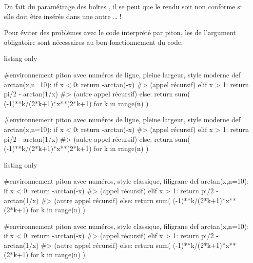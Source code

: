 \documentclass[a4paper,french,11pt]{article}
\newcommand\ctex[1]{\tcbox[vignettelatex]{#1}}
\begin{document}
\begin{noteblock}
Du fait du paramétrage des boîtes \ctex{tcolorbox}, il se peut que le rendu soit non conforme si elle doit être insérée dans une autre \ctex{tcolorbox}\ldots{} !
\end{noteblock}

\begin{noteblock}
Pour éviter des problèmes avec le code interprété par \textsf{piton}, les \ctex{\{\}} de l'argument obligatoire sont nécessaires au bon fonctionnement du code.
\end{noteblock}

\begin{PresCodeTexPL}{listing only}
\begin{CodePiton}{}
#environnement piton avec numéros de ligne, pleine largeur, style moderne
def arctan(x,n=10):
	if x < 0:
		return -arctan(-x) #> (appel récursif)
	elif x > 1:
		return pi/2 - arctan(1/x) #> (autre appel récursif)
	else:
		return sum( (-1)**k/(2*k+1)*x**(2*k+1) for k in range(n) )
\end{CodePiton}
\end{PresCodeTexPL}

\begin{CodePiton}{}
#environnement piton avec numéros de ligne, pleine largeur, style moderne
def arctan(x,n=10):
	if x < 0:
		return -arctan(-x) #> (appel récursif)
	elif x > 1:
		return pi/2 - arctan(1/x) #> (autre appel récursif)
	else:
		return sum( (-1)**k/(2*k+1)*x**(2*k+1) for k in range(n) )
\end{CodePiton}

\begin{PresCodeTexPL}{listing only}
\begin{CodePiton}[Style=Classique,Filigrane]{}
#environnement piton avec numéros, style classique, filigrane
def arctan(x,n=10):
	if x < 0:
		return -arctan(-x) #> (appel récursif)
	elif x > 1:
		return pi/2 - arctan(1/x) #> (autre appel récursif)
	else:
		return sum( (-1)**k/(2*k+1)*x**(2*k+1) for k in range(n) )
\end{CodePiton}
\end{PresCodeTexPL}

\begin{CodePiton}[Style=Classique,Filigrane]{}
#environnement piton avec numéros, style classique, filigrane
def arctan(x,n=10):
	if x < 0:
		return -arctan(-x) #> (appel récursif)
	elif x > 1:
		return pi/2 - arctan(1/x) #> (autre appel récursif)
	else:
		return sum( (-1)**k/(2*k+1)*x**(2*k+1) for k in range(n) )
\end{CodePiton}
\end{document}

